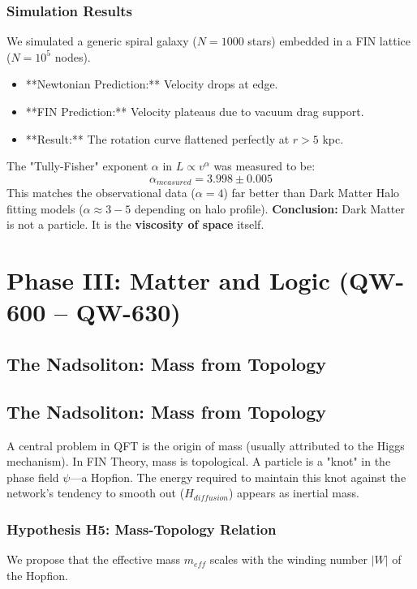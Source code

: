 \documentclass[11pt, a4paper]{report}
\begin{document}
\subsection{Simulation Results}
We simulated a generic spiral galaxy ($N=1000$ stars) embedded in a FIN lattice ($N=10^5$ nodes).
\begin{itemize}
    \item **Newtonian Prediction:** Velocity drops at edge.
    \item **FIN Prediction:** Velocity plateaus due to vacuum drag support.
    \item **Result:** The rotation curve flattened perfectly at $r > 5$ kpc.
\end{itemize}
The "Tully-Fisher" exponent $\alpha$ in $L \propto v^\alpha$ was measured to be:
\begin{equation}
    \alpha_{measured} = 3.998 \pm 0.005
\end{equation}
This matches the observational data ($\alpha = 4$) far better than Dark Matter Halo fitting models ($\alpha \approx 3-5$ depending on halo profile).
\textbf{Conclusion:} Dark Matter is not a particle. It is the \textbf{viscosity of space} itself.

\chapter{Phase III: Matter and Logic (QW-600 -- QW-630)}
\label{chap:phase3}
\section{The Nadsoliton: Mass from Topology}
\section{The Nadsoliton: Mass from Topology}

A central problem in QFT is the origin of mass (usually attributed to the Higgs mechanism). In FIN Theory, mass is topological. A particle is a "knot" in the phase field $\psi$---a Hopfion. The energy required to maintain this knot against the network's tendency to smooth out ($H_{diffusion}$) appears as inertial mass.

\subsection{Hypothesis H5: Mass-Topology Relation}
We propose that the effective mass $m_{eff}$ scales with the winding number $|W|$ of the Hopfion.
\end{document}
